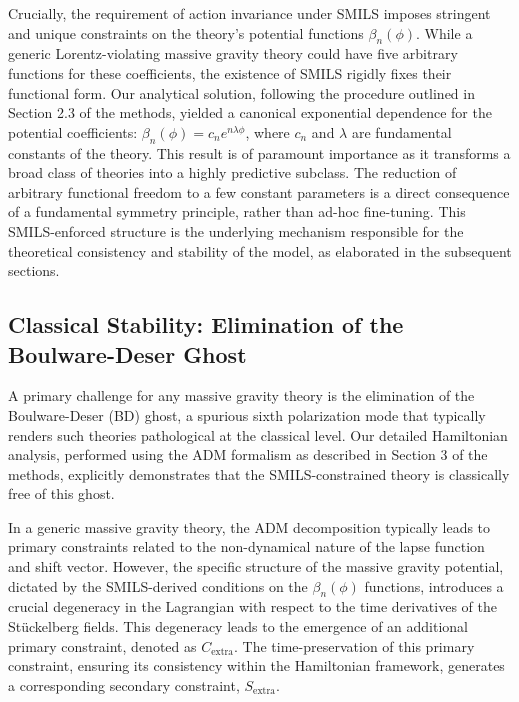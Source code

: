 \documentclass[twocolumn]{aastex631}
\begin{document}
Crucially, the requirement of action invariance under SMILS imposes stringent and unique constraints on the theory's potential functions $\beta_n(\phi)$. While a generic Lorentz-violating massive gravity theory could have five arbitrary functions for these coefficients, the existence of SMILS rigidly fixes their functional form. Our analytical solution, following the procedure outlined in Section 2.3 of the methods, yielded a canonical exponential dependence for the potential coefficients: $\beta_n(\phi) = c_n e^{n\lambda\phi}$, where $c_n$ and $\lambda$ are fundamental constants of the theory. This result is of paramount importance as it transforms a broad class of theories into a highly predictive subclass. The reduction of arbitrary functional freedom to a few constant parameters is a direct consequence of a fundamental symmetry principle, rather than ad-hoc fine-tuning. This SMILS-enforced structure is the underlying mechanism responsible for the theoretical consistency and stability of the model, as elaborated in the subsequent sections.

\subsection{Classical Stability: Elimination of the Boulware-Deser Ghost}
A primary challenge for any massive gravity theory is the elimination of the Boulware-Deser (BD) ghost, a spurious sixth polarization mode that typically renders such theories pathological at the classical level. Our detailed Hamiltonian analysis, performed using the ADM formalism as described in Section 3 of the methods, explicitly demonstrates that the SMILS-constrained theory is classically free of this ghost.

In a generic massive gravity theory, the ADM decomposition typically leads to primary constraints related to the non-dynamical nature of the lapse function and shift vector. However, the specific structure of the massive gravity potential, dictated by the SMILS-derived conditions on the $\beta_n(\phi)$ functions, introduces a crucial degeneracy in the Lagrangian with respect to the time derivatives of the Stückelberg fields. This degeneracy leads to the emergence of an additional primary constraint, denoted as $C_{\text{extra}}$. The time-preservation of this primary constraint, ensuring its consistency within the Hamiltonian framework, generates a corresponding secondary constraint, $S_{\text{extra}}$.
\end{document}
